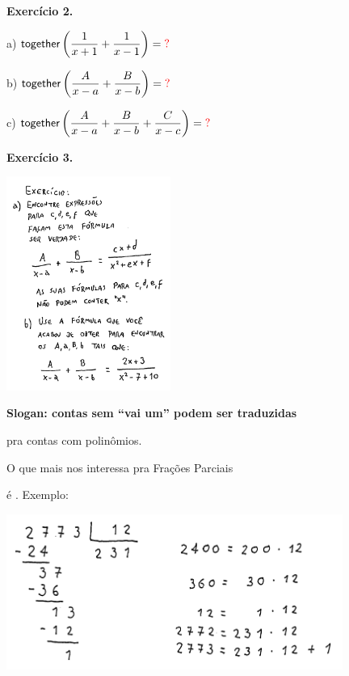 \documentclass[oneside,12pt]{article}
\begin{document}
\newpage

{\bf Exercício 2.}

\msk

a) $\D \togetherp{\frac{1}{x+1} + \frac{1}{x-1}} = \ColorRed{?}$ 

\ssk

b) $\D \togetherp{\frac{A}{x-a} + \frac{B}{x-b}} = \ColorRed{?}$ 

\ssk

c) $\D \togetherp{\frac{A}{x-a} + \frac{B}{x-b} + \frac{C}{x-c}} = \ColorRed{?}$ 






\newpage

{\bf Exercício 3.}

\includegraphics[height=7cm]{2020-1-C2/20201112_C2_fracoes_parciais_4.pdf}

\newpage


{\bf Slogan: contas sem ``vai um'' podem ser traduzidas

pra contas com polinômios.}

\ssk

O que mais nos interessa pra Frações Parciais

é . Exemplo:

\includegraphics[width=11cm]{2020-1-C2/20201118_C2_div_com_resto_1.pdf}
\end{document}

